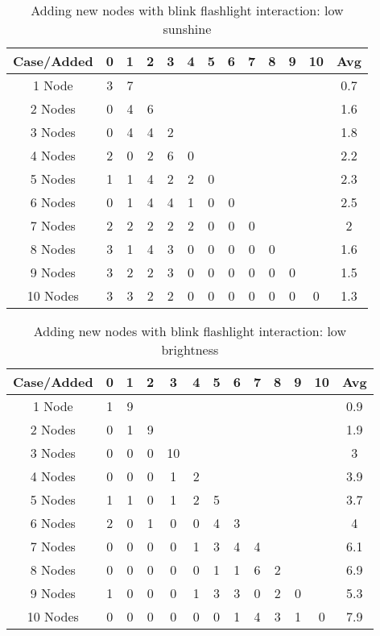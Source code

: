 \begin{table}[htdp]
\caption{{Adding new nodes with blink flashlight interaction: low sunshine}}
\begin{center}
\begin{tabular}{|c|c|c|c|c|c|c|c|c|c|c|c|c|}
\hline
Case/Added	& 0 & 1 & 2 & 3 & 4 &5 &6 & 7 & 8 & 9& 10 & Avg \\
\hline
1 Node 								& 3 & 7&&&&&&&&&&0.7\\
\hline
2 Nodes								& 0 & 4 & 6&&&&&&&&&1.6\\
\hline
3 Nodes								& 0 & 4 & 4 & 2&&&&&&&&1.8\\
\hline
4 Nodes								& 2 & 0 & 2 & 6 & 0&&&&&&&2.2\\
\hline
5 Nodes								& 1 & 1 & 4 & 2 & 2 & 0&&&&&&2.3\\  
\hline
6 Nodes								& 0 & 1 & 4 & 4 & 1 & 0 & 0&&&&&2.5\\
\hline
7 Nodes								& 2 & 2 & 2 & 2 & 2 & 0 & 0 & 0&&&&2\\
\hline
8 Nodes								& 3 & 1 & 4 & 3 & 0 & 0 & 0 & 0 & 0&&&1.6\\
\hline
9 Nodes								& 3 & 2 & 2 & 3 & 0 & 0 & 0 & 0 & 0 &0&&1.5\\
\hline
10 Nodes								& 3 & 3 & 2 & 2 & 0 & 0 & 0 & 0 & 0 &0 & 0&1.3\\
\hline
\end{tabular}
\end{center}
\label{table:evaluation_new_node_flash_sun}
\end{table}%

\begin{table}[htdp]
\caption{{Adding new nodes with blink flashlight interaction: low brightness}}
\begin{center}
\begin{tabular}{|c|c|c|c|c|c|c|c|c|c|c|c|c|}
\hline
Case/Added	& 0 & 1 & 2 & 3 & 4 &5 &6 & 7 & 8 & 9& 10 &Avg\\
\hline
1 Node 								& 1 & 9&&&&&&&&&&0.9\\
\hline
2 Nodes								& 0 & 1 & 9&&&&&&&&&1.9\\
\hline
3 Nodes								& 0 & 0 & 0 & 10&&&&&&&&3\\
\hline
4 Nodes								& 0 & 0 & 0 & 1 & 2&&&&&&&3.9\\
\hline
5 Nodes								& 1 & 1 & 0 & 1 & 2 & 5&&&&&&3.7\\  
\hline
6 Nodes								& 2 & 0 & 1 & 0 & 0 & 4 & 3&&&&&4\\
\hline
7 Nodes								& 0 & 0 & 0 & 0 & 1 & 3 & 4 & 4&&&&6.1\\
\hline
8 Nodes								& 0 & 0 & 0 & 0 & 0 & 1 & 1 & 6 & 2&&&6.9\\
\hline
9 Nodes								& 1 & 0 & 0 & 0 & 1 & 3 & 3 & 0 & 2 &0&&5.3\\
\hline
10 Nodes								& 0 & 0 & 0 & 0 & 0 & 0 & 1 & 4 & 3 &1 & 0&7.9\\
\hline
\end{tabular}
\end{center}
\label{table:evaluation_new_node_flash_brig}
\end{table}%

